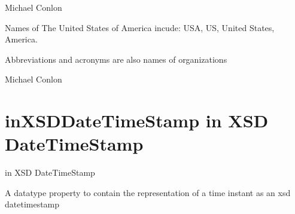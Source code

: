 \documentclass[letterpaper,10pt,english]{sphinxmanual}
\begin{document}
\begin{sphinxShadowBox}

\sphinxAtStartPar
Michael Conlon 
\end{sphinxShadowBox}

\begin{sphinxShadowBox}

\sphinxAtStartPar
Names of The United States of America incude: USA, US, United States, America.
\end{sphinxShadowBox}

\begin{sphinxShadowBox}

\sphinxAtStartPar
Abbreviations and acronyms are also names of organizations
\end{sphinxShadowBox}

\begin{sphinxShadowBox}

\sphinxAtStartPar
Michael Conlon 
\end{sphinxShadowBox}
\begin{quote}

\ignorespaces \end{quote}


\section{inXSDDateTimeStamp \sphinxhyphen{} in XSD Date\sphinxhyphen{}Time\sphinxhyphen{}Stamp}
\label{\detokenize{doc-inXSDDateTimeStamp:inxsddatetimestamp-in-xsd-date-time-stamp}}\label{\detokenize{doc-inXSDDateTimeStamp:index-0}}\label{\detokenize{doc-inXSDDateTimeStamp::doc}}
\begin{sphinxShadowBox}

\sphinxAtStartPar
in XSD Date\sphinxhyphen{}Time\sphinxhyphen{}Stamp
\end{sphinxShadowBox}

\begin{sphinxShadowBox}

\sphinxAtStartPar
A datatype property to contain the representation of a time instant as an xsd datetimestamp
\end{sphinxShadowBox}
\end{document}
